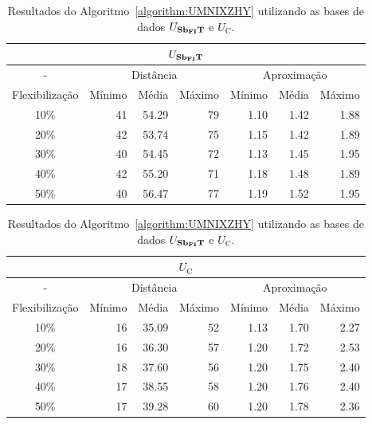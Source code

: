 \begin{table}[!htb]
  \caption{Resultados do Algoritmo~\ref{algorithm:UMNIXZHY} utilizando as bases de dados $U_{\textbf{Sb\textsubscript{FI}T}}{}$ e $U_{\text{C}}$.}
  \label{table:ZQDEMKFX}
  \centering
  \begin{tabular}{|c|r|r|r|r|r|r|}
    \hline
    \multicolumn{7}{|c|}{$U_{\textbf{Sb\textsubscript{FI}T}}{}$}                                                                       \\ \hline
      -            & \multicolumn{3}{c|}{Distância}             & \multicolumn{3}{c|}{Aproximação}           \\ \hline
    Flexibilização & Mínimo       & Média        & Máximo       & Mínimo       & Média        & Máximo       \\ \hline  
    10\%           & 41           & 54.29        & 79           & 1.10         & 1.42         & 1.88         \\ \hline
    20\%           & 42           & 53.74        & 75           & 1.15         & 1.42         & 1.89         \\ \hline
    30\%           & 40           & 54.45        & 72           & 1.13         & 1.45         & 1.95         \\ \hline
    40\%           & 42           & 55.20        & 71           & 1.18         & 1.48         & 1.89         \\ \hline
    50\%           & 40           & 56.47        & 77           & 1.19         & 1.52         & 1.95         \\ \hline    
  \end{tabular}

  \vspace{5mm}

  \begin{tabular}{|c|r|r|r|r|r|r|}
    \hline
    \multicolumn{7}{|c|}{$U_{\text{C}}$}                                                                     \\ \hline
      -            & \multicolumn{3}{c|}{Distância}             & \multicolumn{3}{c|}{Aproximação}           \\ \hline
    Flexibilização & Mínimo       & Média        & Máximo       & Mínimo       & Média        & Máximo       \\ \hline  
    10\%           & 16           & 35.09        & 52           & 1.13         & 1.70         & 2.27         \\ \hline
    20\%           & 16           & 36.30        & 57           & 1.20         & 1.72         & 2.53         \\ \hline
    30\%           & 18           & 37.60        & 56           & 1.20         & 1.75         & 2.40         \\ \hline
    40\%           & 17           & 38.55        & 58           & 1.20         & 1.76         & 2.40         \\ \hline
    50\%           & 17           & 39.28        & 60           & 1.20         & 1.78         & 2.36         \\ \hline    
  \end{tabular}
\end{table}

